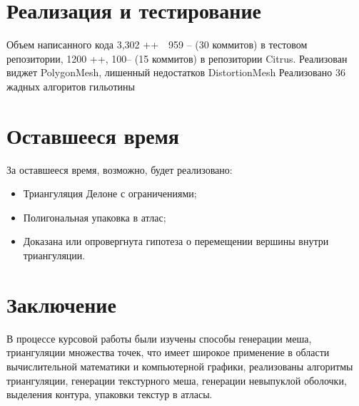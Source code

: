 \documentclass{fefu}
\begin{document}
\section{Реализация и тестирование}
Объем написанного кода 3,302 ++  959 -- (30 коммитов) в тестовом репозитории, 1200 ++, 100-- (15 коммитов) в репозитории Citrus.
Реализован виджет PolygonMesh, лишенный недостатков DistortionMesh
Реализовано 36 жадных алгоритов гильотины
\section*{Оставшееся время}
За оставшееся время, возможно, будет реализовано:
\begin{itemize}
    \item Триангуляция Делоне с ограничениями;
    \item Полигональная упаковка в атлас;
    \item Доказана или опровергнута гипотеза о перемещении вершины внутри триангуляции.
\end{itemize}
\section*{Заключение}
В процессе курсовой работы были изучены способы генерации меша, триангуляции множества точек, что имеет широкое
применение в области вычислительной математики и компьютерной графики, реализованы алгоритмы триангуляции, генерации
текстурного меша, генерации невыпуклой оболочки, выделения контура, упаковки текстур в атласы.
\newpage


\end{document}

